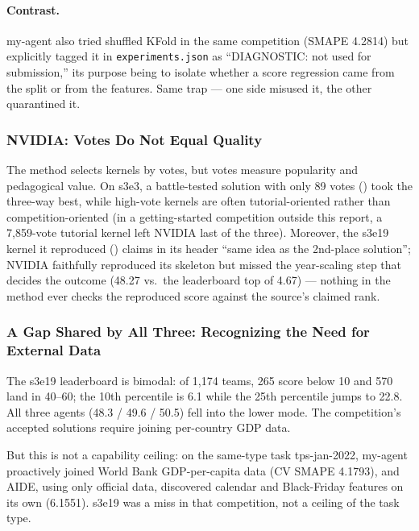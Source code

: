 \documentclass[11pt,a4paper]{article}
\begin{document}
\paragraph{Contrast.} my-agent also tried shuffled KFold in the same competition (SMAPE 4.2814) but explicitly tagged it in \texttt{experiments.json} as ``DIAGNOSTIC: not used for submission,'' its purpose being to isolate whether a score regression came from the split or from the features. Same trap --- one side misused it, the other quarantined it.

\subsubsection{NVIDIA: Votes Do Not Equal Quality}
\label{sec:votes}

The method selects kernels by votes, but votes measure popularity and pedagogical value. On s3e3, a battle-tested solution with only 89 votes () took the three-way best, while high-vote kernels are often tutorial-oriented rather than competition-oriented (in a getting-started competition outside this report, a 7{,}859-vote tutorial kernel left NVIDIA last of the three). Moreover, the s3e19 kernel it reproduced () claims in its header ``same idea as the 2nd-place solution''; NVIDIA faithfully reproduced its skeleton but missed the year-scaling step that decides the outcome (48.27 vs.\ the leaderboard top of 4.67) --- nothing in the method ever checks the reproduced score against the source's claimed rank.

\subsubsection{A Gap Shared by All Three: Recognizing the Need for External Data}
\label{sec:external}

The s3e19 leaderboard is bimodal: of 1{,}174 teams, 265 score below 10 and 570 land in 40--60; the 10th percentile is 6.1 while the 25th percentile jumps to 22.8. All three agents (48.3 / 49.6 / 50.5) fell into the lower mode. The competition's accepted solutions require joining per-country GDP data.

But this is not a capability ceiling: on the same-type task tps-jan-2022, my-agent proactively joined World Bank GDP-per-capita data (CV SMAPE 4.1793), and AIDE, using only official data, discovered calendar and Black-Friday features on its own (6.1551). s3e19 was a miss in that competition, not a ceiling of the task type.
\end{document}
